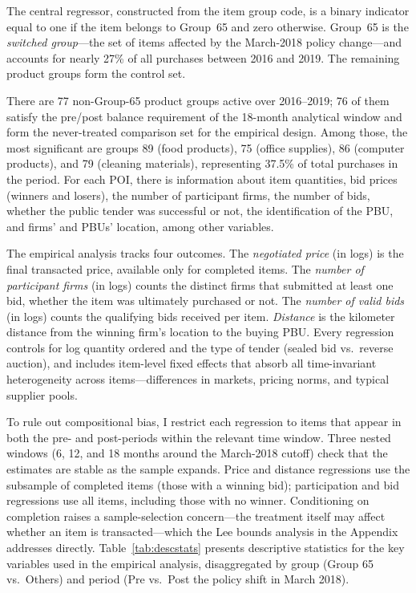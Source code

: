 The central regressor, constructed from the item group code, is a binary indicator equal to one if the item belongs to Group~65 and zero otherwise. Group~65 is the \emph{switched group}---the set of items affected by the March-2018 policy change---and accounts for nearly 27\% of all purchases between 2016 and 2019. The remaining product groups form the control set.

There are 77 non-Group-65 product groups active over 2016--2019; 76 of them satisfy the pre/post balance requirement of the 18-month analytical window and form the never-treated comparison set for the empirical design. Among those, the most significant are groups 89 (food products), 75 (office supplies), 86 (computer products), and 79 (cleaning materials), representing 37.5\% of total purchases in the period. For each POI, there is information about item quantities, bid prices (winners and losers), the number of participant firms, the number of bids, whether the public tender was successful or not, the identification of the PBU, and firms’ and PBUs’ location, among other variables.

The empirical analysis tracks four outcomes. The \emph{negotiated price} (in logs) is the final transacted price, available only for completed items. The \emph{number of participant firms} (in logs) counts the distinct firms that submitted at least one bid, whether the item was ultimately purchased or not. The \emph{number of valid bids} (in logs) counts the qualifying bids received per item. \emph{Distance} is the kilometer distance from the winning firm's location to the buying PBU. Every regression controls for log quantity ordered and the type of tender (sealed bid vs.\ reverse auction), and includes item-level fixed effects that absorb all time-invariant heterogeneity across items---differences in markets, pricing norms, and typical supplier pools.

To rule out compositional bias, I restrict each regression to items that appear in both the pre- and post-periods within the relevant time window. Three nested windows (6, 12, and 18 months around the March-2018 cutoff) check that the estimates are stable as the sample expands. Price and distance regressions use the subsample of completed items (those with a winning bid); participation and bid regressions use all items, including those with no winner. Conditioning on completion raises a sample-selection concern---the treatment itself may affect whether an item is transacted---which the Lee bounds analysis in the Appendix addresses directly. Table~\ref{tab:descstats} presents descriptive statistics for the key variables used in the empirical analysis, disaggregated by group (Group 65 vs.\ Others) and period (Pre vs.\ Post the policy shift in March 2018).

